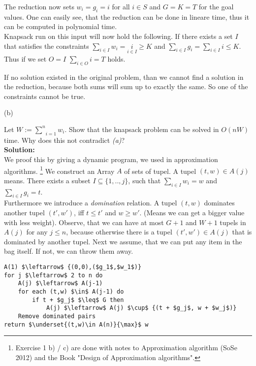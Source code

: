 \begin{description}
The reduction now sets $w_i = g_i = i$ for all $i \in S$ and $G = K = T$ for the goal values. One can
easily see, that the reduction can be done in lineare time, thus it can be computed in polynomial time. \\

Knapsack run on this input will now hold the following. If there exists a set $I$ that satisfies the constraints
$\underset{ i \in I}{\sum} w_i = \underset{i \in I} i \geq K$ and $\underset{i \in I}{\sum} g_i = \underset{i \in I}{\sum} i \leq K$.
Thus if we set $O = I$ $\underset{i \in O}{\sum} i = T$ holds.

If no solution existed in the original problem, than we cannot find a solution in the reduction, because both sums
will sum up to exactly the same. So one of the constraints cannot be true.

\item{(b)}

Let $W := \underset{i=1}{\overset{n}{\sum}} w_i$. Show that the knapsack problem can be solved in $O(nW)$ time. Why does this not
contradict \emph{(a)}?\\

\textbf{Solution:}\\

We proof this by giving a dynamic program, we used in approximation algorithms.
\footnote{Exercise 1 b) / c) are done with notes to Approximation algorithm (SoSe 2012) and the Book "Design of Approximation algorithms".}
We construct an Array $A$ of sets of tupel. A tupel $(t,w) \in A(j)$ means. There exists a 
subset $I \subseteq \{1,..,j \}$, such that $\underset{i \in I}{\sum} w_i = w$ and $\underset{i \in I}{\sum} g_i = t$.\\

Furthermore we introduce a \emph{domination} relation. A tupel $(t,w)$ dominates another tupel $(t',w')$, iff $t \leq t'$ and $w \geq w'$.
(Means we can get a bigger value with less weight).
Observe, that we can have at most $G+1$ and $W+1$ tupels in $A(j)$ for any $j\leq n$, because otherwise there is a tupel $(t',w') \in A(j)$
that is dominated by another tupel.
Next we assume, that we can put any item in the bag itself. If not, we can throw them away.

\begin{lstlisting}
A(1) $\leftarrow$ {(0,0),($g_1$,$w_1$)}
for j $\leftarrow$ 2 to n do
    A(j) $\leftarrow$ A(j-1)
    for each (t,w) $\in$ A(j-1) do
        if t + $g_j$ $\leq$ G then
            A(j) $\leftarrow$ A(j) $\cup$ {(t + $g_j$, w + $w_j$)}
    Remove dominated pairs
return $\underset{(t,w)\in A(n)}{\max}$ w
\end{lstlisting}


\end{description}
